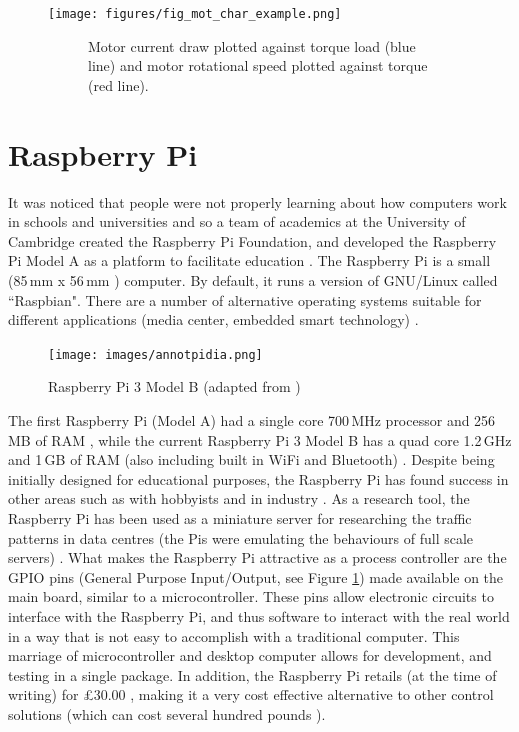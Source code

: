 \documentclass[twoside,a4]{report}
\def\br{\newline \newline \noindent}
\begin{document}
	\begin{figure}[!htb]
		\centering
		\texttt{[image: figures/fig\_mot\_char\_example.png]}
		\caption{Example DC Motor Characteristic Curve (adapted from \cite{dvdmotordat})}
		\label{figmotcharexample}
		\begin{subfigure}{0.9\textwidth}
			\footnotesize Motor current draw plotted against torque load (blue line) and motor rotational speed plotted against torque (red line).
		\end{subfigure}
	\end{figure}
	
	\section*{Raspberry Pi}
	It was noticed that people were not properly learning about how computers work in schools and universities and so a team of academics at the University of Cambridge created the Raspberry Pi Foundation, and developed the Raspberry Pi Model A as a platform to facilitate education \cite{pihistory}. The Raspberry Pi is a small (85\,mm x 56\,mm \cite{pi3mechdraw}) computer. By default, it runs a version of GNU/Linux called ``Raspbian". There are a number of alternative operating systems suitable for different applications (media center, embedded smart technology) \cite{piotheros}.  \newline
	\begin{figure}[!htb]
		\centering
		\texttt{[image: images/annotpidia.png]} %
		\caption{Raspberry Pi 3 Model B (adapted from  \cite{pi3info})}
		\label{pidia}
	\end{figure} 
	\newline
	\noindent
	The first Raspberry Pi (Model A) had a single core 700\,MHz processor and 256\,MB of RAM \cite{pi1info}, while the current Raspberry Pi 3 Model B has a quad core 1.2\,GHz and 1\,GB of RAM (also including built in WiFi and Bluetooth) \cite{pi3info}. 
	\br
	Despite being initially designed for educational purposes, the Raspberry Pi has found success in other areas such as with hobbyists \cite{pihobbynotedu} and in industry \cite{pimorethanedu}. As a research tool, the Raspberry Pi has been used as a miniature server for researching the traffic patterns in data centres (the Pis were emulating the behaviours of full scale servers) \cite{piglasgowdc}.
	\br
	What makes the Raspberry Pi attractive as a process controller are the GPIO pins (General Purpose Input/Output, see Figure \ref{pidia}) made available on the main board, similar to a microcontroller. These pins allow electronic circuits to interface with the Raspberry Pi, and thus software to interact with the real world in a way that is not easy to accomplish with a traditional computer. This marriage of microcontroller and desktop computer allows for development, and testing in a single package. In addition, the Raspberry Pi retails (at the time of writing) for \pounds 30.00 \cite{picost}, making it a very cost effective alternative to other control solutions (which can cost several hundred pounds \cite{otherpcucost}). 
\end{document}
